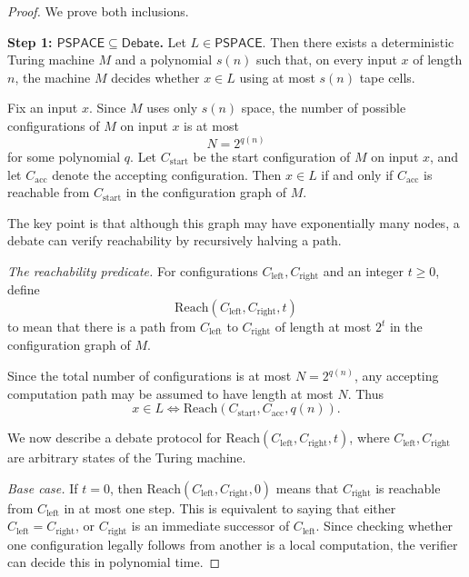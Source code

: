 \documentclass[11pt]{article}
\begin{document}
\begin{proof}
We prove both inclusions.

\medskip

\noindent\textbf{Step 1: \(\mathsf{PSPACE} \subseteq \mathsf{Debate}\).}
Let \(L \in \mathsf{PSPACE}\). Then there exists a deterministic Turing machine \(M\) and a polynomial \(s(n)\) such that, on every input \(x\) of length \(n\), the machine \(M\) decides whether \(x\in L\) using at most \(s(n)\) tape cells.

Fix an input \(x\). Since \(M\) uses only \(s(n)\) space, the number of possible configurations of \(M\) on input \(x\) is at most
\[
N = 2^{q(n)}
\]
for some polynomial \(q\). Let \(C_{\mathrm{start}}\) be the start configuration of \(M\) on input \(x\), and let \(C_{\mathrm{acc}}\) denote the accepting configuration. Then \(x\in L\) if and only if \(C_{\mathrm{acc}}\) is reachable from \(C_{\mathrm{start}}\) in the configuration graph of \(M\).

The key point is that although this graph may have exponentially many nodes, a debate can verify reachability by recursively halving a path.

\medskip

\noindent\emph{The reachability predicate.}
For configurations \(C_{\mathrm{left}},C_{\mathrm{right}}\) and an integer \(t \geq 0\), define
\[
\mathrm{Reach}(C_{\mathrm{left}},C_{\mathrm{right}},t)
\]
to mean that there is a path from \(C_{\mathrm{left}}\) to \(C_{\mathrm{right}}\) of length at most \(2^t\) in the configuration graph of \(M\).

Since the total number of configurations is at most \(N = 2^{q(n)}\), any accepting computation path may be assumed to have length at most \(N\). Thus
\[
x\in L
\iff
\mathrm{Reach}(C_{\mathrm{start}}, C_{\mathrm{acc}}, q(n)).
\]

We now describe a debate protocol for \(\mathrm{Reach}(C_{\mathrm{left}},C_{\mathrm{right}},t)\), where $C_{\mathrm{left}},C_{\mathrm{right}}$ are arbitrary states of the Turing machine.

\medskip

\noindent\emph{Base case.}
If \(t=0\), then \(\mathrm{Reach}(C_{\mathrm{left}},C_{\mathrm{right}},0)\) means that \(C_{\mathrm{right}}\) is reachable from \(C_{\mathrm{left}}\) in at most one step. This is equivalent to saying that either \(C_{\mathrm{left}}=C_{\mathrm{right}}\), or \(C_{\mathrm{right}}\) is an immediate successor of \(C_{\mathrm{left}}\). Since checking whether one configuration legally follows from another is a local computation, the verifier can decide this in polynomial time.


\end{proof}
\end{document}
